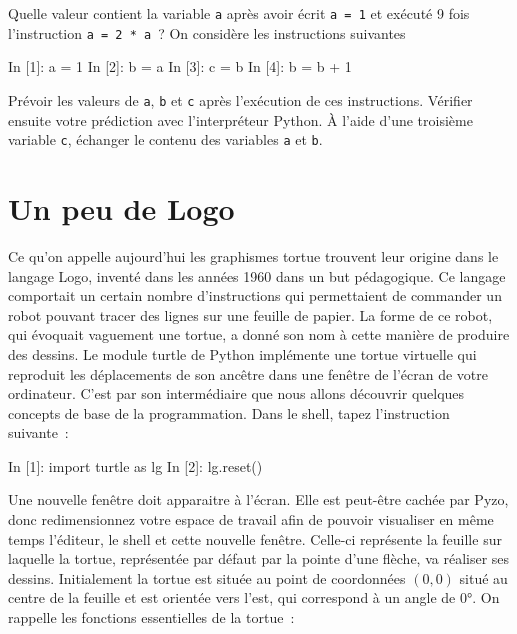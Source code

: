 \documentclass{magnoliaold}
\begin{document}
\begin{questions}
\question Quelle valeur contient la variable \verb_a_ après avoir écrit \verb_a = 1_ et exécuté 9 fois l'instruction \verb_a = 2 * a_~?
\question On considère les instructions suivantes
\begin{pythoncode}
In [1]: a = 1
In [2]: b = a
In [3]: c = b
In [4]: b = b + 1
\end{pythoncode}
Prévoir les valeurs de \verb_a_, \verb_b_ et \verb_c_ après l'exécution de ces instructions. Vérifier ensuite votre prédiction avec l'interpréteur Python.
\question À l'aide d'une troisième variable \verb_c_, échanger le contenu des variables \verb_a_ et \verb_b_.
\end{questions}



\section{Un peu de Logo}

Ce qu'on appelle aujourd'hui les graphismes \og tortue \fg trouvent leur origine dans le langage Logo, inventé dans
les années 1960 dans un but pédagogique. Ce langage comportait un certain nombre d'instructions qui permettaient de commander
un robot pouvant tracer des lignes sur une feuille de papier. La forme de ce robot, qui évoquait vaguement une tortue, a donné
son nom à cette manière de produire des dessins. Le module turtle de Python implémente une tortue virtuelle qui reproduit les
déplacements de son ancêtre dans une fenêtre de l'écran de votre ordinateur. C'est par son intermédiaire que nous allons
découvrir quelques concepts de base de la programmation. Dans le shell, tapez l'instruction suivante~:

\begin{pythoncode}
In [1]: import turtle as lg
In [2]: lg.reset()
\end{pythoncode}
\noindent
Une nouvelle fenêtre doit apparaitre à l'écran. Elle est peut-être cachée par Pyzo, donc redimensionnez votre espace de
travail afin de pouvoir visualiser en même temps l'éditeur, le shell et cette nouvelle fenêtre. Celle-ci représente
la feuille sur laquelle la tortue, représentée par défaut par la pointe d'une flèche, va réaliser ses dessins. Initialement
la tortue est située au point de coordonnées $(0, 0)$ situé au centre de la feuille et est orientée vers l'est, qui
correspond à un angle de $\ang{0}$. On rappelle les fonctions essentielles de la tortue~:
\end{document}
